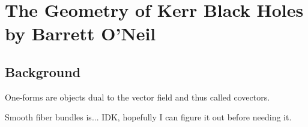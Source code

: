 \chapter{The Geometry  of Kerr Black Holes by Barrett O'Neil}

\section{Background}

One-forms are objects dual to the vector field and thus called covectors.

Smooth fiber bundles is... IDK, hopefully I can figure it out before needing it.
